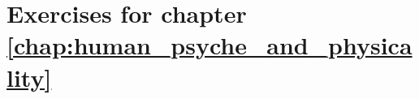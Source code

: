 \chapter{Exercises for chapter \ref{chap:human_psyche_and_physicality}} \label{chap:human_psyche_and_physicality_exercises}

